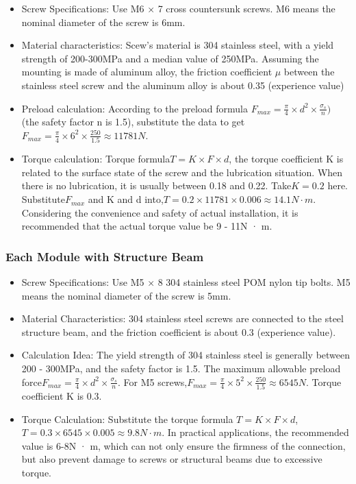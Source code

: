 \documentclass{article}
\begin{document}
\begin{itemize}
    \item Screw Specifications: Use M6 × 7 cross countersunk screws. M6 means the nominal diameter of the screw is 6mm.
    \item Material characteristics: Scew's material is 304 stainless steel, with a yield strength of 200-300MPa and a median value of 250MPa. Assuming the mounting is made of aluminum alloy, the friction coefficient $\mu$  between the stainless steel screw and the aluminum alloy is about 0.35 (experience value)
    \item Preload calculation: According to the preload formula $F_{max} =\frac {\pi} {4}\times d ^ {2}\times\frac {\sigma_ {s}} {n})$ (the safety factor n is 1.5), substitute the data to get$F_ {max} =\frac {\pi} {4}\times 6 ^ {2}\times\frac {250} {1.5}\approx 11781N$.
    \item Torque calculation: Torque formula$T = K \times F\times d$, the torque coefficient K is related to the surface state of the screw and the lubrication situation. When there is no lubrication, it is usually between 0.18 and 0.22. Take$K = 0.2$ here. Substitute$F_ {max}$ and K and d into,$T = 0.2 \times 11781\times 0.006\approx 14.1N · m$. Considering the convenience and safety of actual installation, it is recommended that the actual torque value be 9 - 11N · m.
\end{itemize}

\subsubsection{Each Module with Structure Beam}

\begin{itemize}
    \item Screw Specifications: Use M5 × 8 304 stainless steel POM nylon tip bolts. M5 means the nominal diameter of the screw is 5mm.
    \item Material Characteristics: 304 stainless steel screws are connected to the steel structure beam, and the friction coefficient is about 0.3 (experience value).
    \item Calculation Idea: The yield strength of 304 stainless steel is generally between 200 - 300MPa, and the safety factor is 1.5. The maximum allowable preload force$F_ {max} =\frac {\pi} {4}\times d ^ {2}\times\frac {\sigma_ {s}} {n}$. For M5 screws,$F_ {max} =\frac {\pi} {4}\times 5 ^ {2}\times\frac {250} {1.5}\approx 6545N$. Torque coefficient K is 0.3.
    \item Torque Calculation: Substitute the torque formula $T = K\times F\times d$,$T = 0.3\times 6545\times 0.005\approx 9.8N · m$. In practical applications, the recommended value is 6-8N · m, which can not only ensure the firmness of the connection, but also prevent damage to screws or structural beams due to excessive torque.
\end{itemize}
\clearpage
\end{document}
